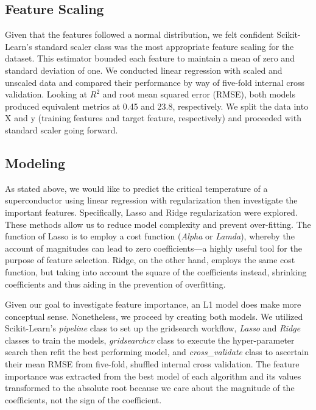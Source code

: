 \documentclass[twoside,twocolumn]{article}
\begin{document}
\subsection{Feature Scaling}
Given that the features followed a normal distribution, we felt confident Scikit-Learn’s standard scaler class was the most appropriate feature scaling for the dataset. This estimator bounded each feature to maintain a mean of zero and standard deviation of one. We conducted linear regression with scaled and unscaled data and compared their performance by way of five-fold internal cross validation. Looking at $R^{2}$ and root mean squared error (RMSE), both models produced equivalent metrics at 0.45 and 23.8, respectively. We split the data into X and y (training features and target feature, respectively) and proceeded with standard scaler going forward.

\subsection{Modeling}
As stated above, we would like to predict the critical temperature of a superconductor using linear regression with regularization then investigate the important features. Specifically, Lasso and Ridge regularization were explored. These methods allow us to reduce model complexity and prevent over-fitting. The function of Lasso is to employ a cost function (\emph{Alpha} or \emph{Lamda}), whereby the account of magnitudes can lead to zero coefficients---a highly useful tool for the purpose of feature selection. Ridge, on the other hand, employs the same cost function, but taking into account the square of the coefficients instead, shrinking coefficients and thus aiding in the prevention of overfitting.

Given our goal to investigate feature importance, an L1 model does make more conceptual sense. Nonetheless, we proceed by creating both models. We utilized Scikit-Learn’s \emph{pipeline} class to set up the gridsearch workflow, \emph{Lasso} and \emph{Ridge} classes to train the models, \emph{gridsearchcv} class to execute the hyper-parameter search then refit the best performing model, and \emph{cross\_validate} class to ascertain their mean RMSE from five-fold, shuffled internal cross validation. The feature importance was extracted from the best model of each algorithm and its values transformed to the absolute root because we care about the magnitude of the coefficients, not the sign of the coefficient.


\end{document}
